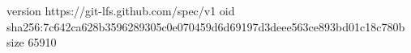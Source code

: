 version https://git-lfs.github.com/spec/v1
oid sha256:7c642ca628b3596289305c0e070459d6d69197d3deee563ce893bd01c18c780b
size 65910

